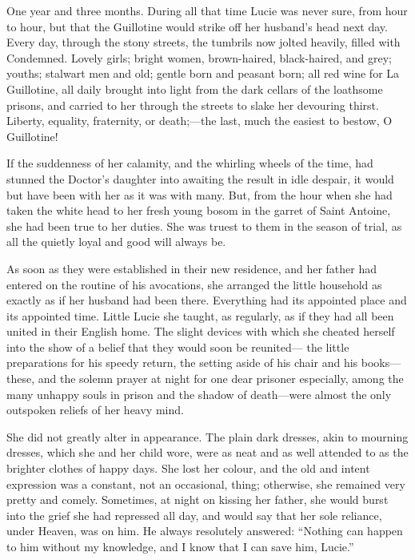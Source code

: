 One year and three months.  During all that time Lucie was never
sure, from hour to hour, but that the Guillotine would strike off her
husband's head next day.  Every day, through the stony streets, the
tumbrils now jolted heavily, filled with Condemned.  Lovely girls;
bright women, brown-haired, black-haired, and grey; youths; stalwart
men and old; gentle born and peasant born; all red wine for La
Guillotine, all daily brought into light from the dark cellars of the
loathsome prisons, and carried to her through the streets to slake
her devouring thirst.  Liberty, equality, fraternity, or death;---the
last, much the easiest to bestow, O Guillotine!

If the suddenness of her calamity, and the whirling wheels of the
time, had stunned the Doctor's daughter into awaiting the result in
idle despair, it would but have been with her as it was with many.
But, from the hour when she had taken the white head to her fresh
young bosom in the garret of Saint Antoine, she had been true to her
duties.  She was truest to them in the season of trial, as all the
quietly loyal and good will always be.

As soon as they were established in their new residence, and her
father had entered on the routine of his avocations, she arranged the
little household as exactly as if her husband had been there.
Everything had its appointed place and its appointed time.  Little
Lucie she taught, as regularly, as if they had all been united in
their English home.  The slight devices with which she cheated
herself into the show of a belief that they would soon be reunited---%
the little preparations for his speedy return, the setting aside of
his chair and his books---these, and the solemn prayer at night for
one dear prisoner especially, among the many unhappy souls in prison
and the shadow of death---were almost the only outspoken reliefs of
her heavy mind.

She did not greatly alter in appearance.  The plain dark dresses,
akin to mourning dresses, which she and her child wore, were as neat
and as well attended to as the brighter clothes of happy days.
She lost her colour, and the old and intent expression was a constant,
not an occasional, thing; otherwise, she remained very pretty and
comely.  Sometimes, at night on kissing her father, she would burst
into the grief she had repressed all day, and would say that her sole
reliance, under Heaven, was on him.  He always resolutely answered:
``Nothing can happen to him without my knowledge, and I know that I
can save him, Lucie.''

